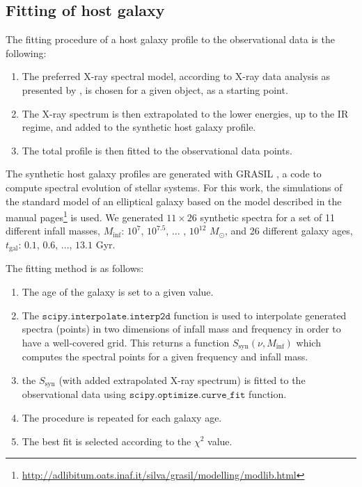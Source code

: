 \subsection{Fitting of host galaxy}
The fitting procedure of a host galaxy profile to the observational data is the following:
\begin{enumerate}
\item The preferred X-ray spectral model, according to X-ray data analysis as presented by \cite{Wierzcholska2016}, is chosen for a  given object, as a starting point. 
\item The X-ray spectrum is then extrapolated to the lower energies, up to the IR regime, and added to the synthetic host galaxy profile.
\item The total profile is then fitted to the observational data points.
\end{enumerate}



The synthetic host galaxy profiles are generated with GRASIL \citep[for more details see][]{Silva98, Silvathesis, grasil}, a code to compute spectral evolution of stellar systems.
For this work,  the simulations of the standard model of an elliptical galaxy based on the model described in the manual pages\footnote{\url{http://adlibitum.oats.inaf.it/silva/grasil/modelling/modlib.html}} is used. 
We generated $11 \times 26$ synthetic spectra for a set of 11 different infall masses, $M_\textrm{inf}$: $10^7$, $10^{7.5}$, ... , $10^{12}$ $M_\odot$, and 26 different galaxy ages, $t_\textrm{gal}$:  $0.1$, $0.6$, ..., $13.1$ Gyr.


The fitting method is as follows:
\begin{enumerate}
 \item The age of the galaxy is set to a given value.
 \item The $\texttt{scipy.interpolate.interp2d}$ function \citep{SciPy} is used to interpolate generated spectra (points) in two dimensions of infall mass and frequency in order to have a well-covered grid. 
 This returns a function $S_\textrm{syn}(\nu,M_\textrm{inf})$ which computes the spectral points for a given frequency and infall mass.
 \item the $S_\textrm{syn}$  (with added extrapolated X-ray spectrum) is fitted to the observational data using  $\texttt{scipy.optimize.curve\_fit}$ function.
 \item The procedure is repeated for each galaxy age.
 \item The best fit is selected according to the $\chi^2$ value.
\end{enumerate}

